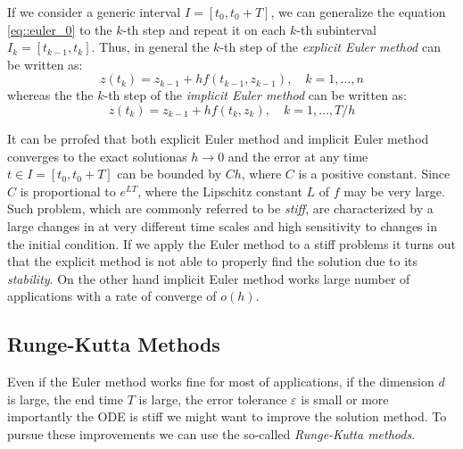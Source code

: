 If we consider a generic interval $I=[t_0, t_0+T]$, we can generalize the equation \eqref{eq::euler_0} to the $k$-th step and repeat it on each $k$-th subinterval $I_k=[t_{k-1}, t_k]$. Thus, in general the $k$-th step of the \textit{explicit Euler method} can be written as:
\begin{equation}
	z(t_k) = z_{k-1} + hf(t_{k-1},z_{k-1}), \quad k=1,\dots,n
	\label{eq::euler_explicit}
\end{equation}
whereas the the $k$-th step of the \textit{implicit Euler method} can be written as:
\begin{equation}
	z(t_k) = z_{k-1} + hf(t_{k},z_{k}), \quad k=1,\dots,T/h
	\label{eq::euler_implicit}
\end{equation}

It can be prrofed that both explicit Euler method and implicit Euler method converges to the exact solutionas $h\rightarrow0$ and the error at any time $t \in I = [t_0, t_0+T]$ can be bounded by $Ch$, where $C$ is a positive constant. Since $C$ is proportional to $e^{LT}$, where the Lipschitz constant $L$ of $f$ may be very large. Such problem, which are commonly referred to be \textit{stiff}, are characterized by a large changes in at very different time scales and high sensitivity to changes in the initial condition. If we apply the Euler method to a stiff problems it turns out that the explicit method is not able to properly find the solution due to its \textit{stability}. On the other hand implicit Euler method works large number of applications with a rate of converge of $o(h)$.

\subsection{Runge-Kutta Methods}
Even if the Euler method works fine for most of applications, if the dimension $d$ is large, the end time $T$ is large, the error tolerance $\varepsilon$ is small or more importantly the ODE is stiff we might want to improve the solution method. To pursue these improvements we can use the so-called \textit{Runge-Kutta methods}.

